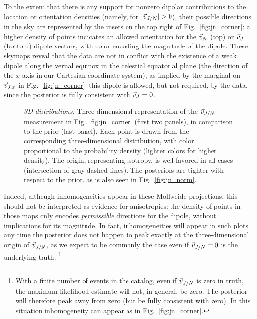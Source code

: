 \documentclass[aps,prd,twocolumn,superscriptaddress,preprintnumbers,floatfix,nofootinbib]{revtex4-2}
\begin{document}
To the extent that there is any support for nonzero dipolar contributions to the location or orientation densities (namely, for $|\vec{v}_{J/N}| > 0$), their possible directions in the sky are represented by the insets on the top right of Fig.~\ref{fig:jn_corner}: a higher density of points indicates an allowed orientation for the $\vec{v}_{N}$ (top) or $\vec{v}_{J}$ (bottom) dipole vectors, with color encoding the magnitude of the dipole.
These skymaps reveal that the data are not in conflict with the existence of a weak dipole along the vernal equinox in the celestial equatorial plane (the direction of the $x$ axis in our Cartesian coordinate system), as implied by the marginal on $\vec{v}_{J,x}$ in Fig.~\ref{fig:jn_corner}; this dipole is allowed, but not required, by the data, since the posterior is fully consistent with $\vec{v}_{J} = 0$.

\begin{figure*}[hbt!]
\caption{\emph{3D distributions.} Three-dimensional representation of the $\vec{v}_{J/N}$ measurement in Fig.~\ref{fig:jn_corner} (first two panels), in comparison to the prior (last panel).
Each point is drawn from the corresponding three-dimensional distribution, with color proportional to the probability density (lighter colors for higher density).
The origin, representing isotropy, is well favored in all cases (intersection of gray dashed lines).
The posteriors are tighter with respect to the prior, as is also seen in Fig.~\ref{fig:jn_norm}.
}
\label{fig:density_3d}
\end{figure*}

Indeed, although inhomogeneities appear in these Mollweide projections, this should not be interpreted as evidence for anisotropies: the density of points in those maps only encodes \emph{permissible} directions for the dipole, without implications for its magnitude.
In fact, inhomogeneities will appear in such plots any time the posterior does not happen to peak exactly at the three-dimensional origin of $\vec{v}_{J/N}$, as we expect to be commonly the case even if $\vec{v}_{J/N}=0$ is the underlying truth.%
\footnote{With a finite number of events in the catalog, even if $\vec{v}_{J/N}$ is zero in truth, the maximum-likelihood estimate will not, in general, be zero.  The posterior will therefore peak away from zero (but be fully consistent with zero).  In this situation inhomogeneity can appear as in Fig.\ \ref{fig:jn_corner}.}
\end{document}
